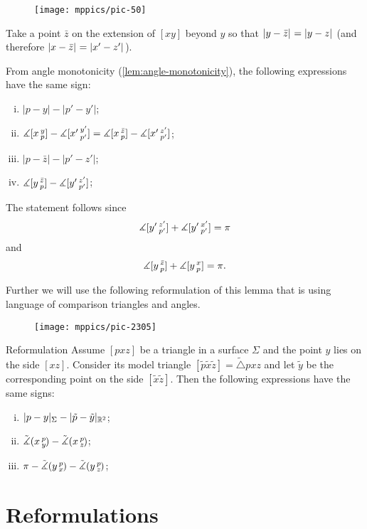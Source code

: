 \begin{figure}[h!]
\vskip-0mm
\centering
\texttt{[image: mppics/pic-50]}
\vskip-0mm
\end{figure}

Take 
a point $\bar z$ on the extension of 
$[xy]$ beyond $y$ so that $\dist{y}{\bar z}{}=\dist{y}{z}{}$ (and therefore $\dist{x}{\bar z}{}=\dist{x'}{z'}{}$). 
 
From angle monotonicity (\ref{lem:angle-monotonicity}), 
the following expressions have the same sign:
\begin{enumerate}[(i)]
\item $|p-y|-|p'-y'|$;
\item $\measuredangle[x\,{}^{y}_{p}]-\measuredangle[x'\,{}^{y'}_{p'}]=\measuredangle[x\,{}^{\bar z}_{p}]-\measuredangle[x'\,{}^{z'}_{p'}]$;
\item $|p-\bar z|-|p'-z'|$;
\item $\measuredangle[y\,{}^{\bar z}_{p}]-\measuredangle[y'\,{}^{z'}_{p'}]$;
\end{enumerate}
The statement follows since
\[\measuredangle[y'\,{}^{z'}_{p'}]+\measuredangle[y'\,{}^{x'}_{p'}]=\pi\]
and
\[\measuredangle[y\,{}^{\bar z}_{p}]+\measuredangle[y\,{}^{x}_{p}]=\pi.\]
\qedsf

Further we will use the following reformulation of this lemma that is using language of comparison triangles and angles.

\begin{wrapfigure}{r}{25mm}
\vskip-0mm
\centering
\texttt{[image: mppics/pic-2305]}
\end{wrapfigure}

\begin{thm}{Reformulation}\label{lem:alex-reformulation}
\label{lem:alex}
Assume $[pxz]$ be a triangle in a surface $\Sigma$ and 
the point $y$ lies on the side $[xz]$.
Consider its model triangle $[\tilde p\tilde x\tilde z]=\tilde\triangle pxz$ and let $\tilde y$ be the corresponding point on the side $[\tilde x\tilde z]$.
Then the following expressions have the same signs:
\begin{enumerate}[(i)]
 \item $|p-y|_\Sigma-|\tilde p-\tilde y|_{\mathbb{R}^2}$;
 \item $\tilde\measuredangle(x\,{}^{p}_{y}\hspace{-0.2ex})-\tilde\measuredangle(x\,{}^{p}_{z}\hspace{-0.2ex})$;
 \item $\pi-\tilde\measuredangle(y\,{}^{p}_{x}\hspace{-0.2ex})-\tilde\measuredangle(y\,{}^{p}_{z}\hspace{-0.2ex})$;
\end{enumerate}
\end{thm}

\section{Reformulations}


